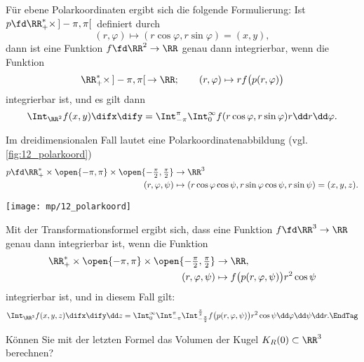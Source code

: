\begin{antwort}
   F\"ur ebene Polarkoordinaten ergibt sich die folgende Formulierung: 
  Ist $p\fd \RR_+^* \times \, ]-\pi, \pi [ \,$ 
  definiert durch 
  \[
  (r,\varphi) \mapsto (r \cos\varphi, r\sin\varphi ) = (x,y),
  \]
  dann ist eine Funktion $f\fd \RR^2 \to \RR$ genau dann 
  integrierbar, wenn die Funktion
  \[
  \RR_+^* \times \, ] -\pi, \pi [ \, \to \RR; 
  \qquad 
  (r,\varphi) \mapsto r f \big( p(r,\varphi) \big) 
  \]
  integrierbar ist, und es gilt dann 
  \[
  \Int_{\RR^2} f(x,y) \difx\dify = 
  \Int_{-\pi}^{\pi} \Int_0^\infty 
  f( r\cos\varphi, r\sin\varphi ) r \dd r \dd \varphi.
  \]

  \medskip\noindent
   Im dreidimensionalen Fall lautet 
  eine Polarkoordinatenabbildung (vgl. \Abb\ref{fig:12_polarkoord}) 
  \begin{align*}
    p\fd \RR_+^* \times \open{-\pi,\pi} 
    \times \open{-\tfrac{\pi}{2}, \tfrac{\pi}{2} } 
    &\to \RR^3 \\  
    (r,\varphi,\psi) &\mapsto (r \cos\varphi \cos \psi, r\sin\varphi \cos\psi, 
    r\sin\psi ) = (x,y,z).
  \end{align*}

  \begin{center}
    \texttt{[image: mp/12\_polarkoord]}
    \label{fig:12_polarkoord}
  \end{center}

  \noindent
  Mit der Transformationsformel ergibt sich,  
  dass eine Funktion $f\fd \RR^3 \to \RR$ genau dann 
  integrierbar ist, wenn die Funktion
  \begin{align*}
    \RR_+^* \times \open{-\pi,\pi}
    \times \open{-\tfrac{\pi}{2}, \tfrac{\pi}{2}} &\to \RR, \\ 
    (r,\varphi,\psi) &\mapsto  f \big( p(r,\varphi,\psi) \big) r^2  \cos \psi 
  \end{align*}
  \vspace*{-3mm}%
  integrierbar ist, und in diesem Fall gilt: 
  \[
  \Int_{\RR^3} f(x,y,z) \difx\dify\dd z = 
  \Int_0^\infty
  \Int_{-\pi}^\pi 
  \Int_{-\frac{\pi}{2}}^{\frac{\pi}{2}} 
  f\big( p( r,\varphi,\psi) \big) r^2 \cos\psi  \dd \varphi \dd \psi \dd r.
  \EndTag
  \]
  
\end{antwort} 

\begin{frage}
  K\"onnen Sie mit der letzten Formel das Volumen der 
  Kugel $K_R(0) \subset \RR^3$ berechnen?
\end{frage}

